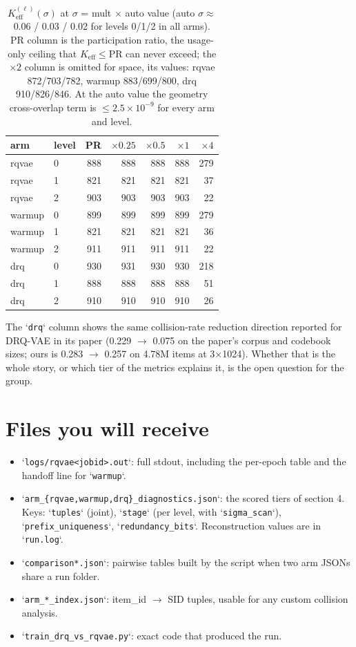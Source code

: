 \documentclass[11pt]{article}
\newcommand{\Keff}{K_{\mathrm{eff}}}
\begin{document}
\begin{table}[h]
\centering
\begin{tabular}{llrrrrr}
\toprule
arm & level & PR & $\times0.25$ & $\times0.5$ & $\times1$ & $\times4$ \\
\midrule
rqvae  & 0 & 888 & 888 & 888 & 888 & 279 \\
rqvae  & 1 & 821 & 821 & 821 & 821 & 37 \\
rqvae  & 2 & 903 & 903 & 903 & 903 & 22 \\
\midrule
warmup & 0 & 899 & 899 & 899 & 899 & 279 \\
warmup & 1 & 821 & 821 & 821 & 821 & 36 \\
warmup & 2 & 911 & 911 & 911 & 911 & 22 \\
\midrule
drq    & 0 & 930 & 931 & 930 & 930 & 218 \\
drq    & 1 & 888 & 888 & 888 & 888 & 51 \\
drq    & 2 & 910 & 910 & 910 & 910 & 26 \\
\bottomrule
\end{tabular}
\caption{$\Keff^{(\ell)}(\sigma)$ at $\sigma$ = mult $\times$ auto value
(auto $\sigma\approx$ 0.06 / 0.03 / 0.02 for levels 0/1/2 in all arms).
PR column is the participation ratio, the usage-only ceiling that
$\Keff\le$PR can never exceed; the $\times2$ column is omitted for space, its
values: rqvae 872/703/782, warmup 883/699/800,
drq 910/826/846. At the auto value the geometry cross-overlap term is
$\le 2.5\times10^{-9}$ for every arm and level.}
\end{table}

The `\texttt{drq}` column shows the same collision-rate reduction direction
reported for DRQ-VAE in its paper (0.229 $\to$ 0.075 on the paper's corpus and
codebook sizes; ours is 0.283 $\to$ 0.257 on 4.78M items at 3$\times$1024).
Whether that is the whole story, or which tier of the metrics explains it, is
the open question for the group.

\section{Files you will receive}

\begin{itemize}[nosep]
  \item `\texttt{logs/rqvae\textless jobid\textgreater.out}`: full stdout,
  including the per-epoch table and the handoff line for `\texttt{warmup}`.
  \item `\texttt{arm\_\{rqvae,warmup,drq\}\_diagnostics.json}`: the scored tiers
  of section 4. Keys: `\texttt{tuples}` (joint), `\texttt{stage}` (per level,
  with `\texttt{sigma\_scan}`), `\texttt{prefix\_uniqueness}`,
  `\texttt{redundancy\_bits}`. Reconstruction values are in `\texttt{run.log}`.
  \item `\texttt{comparison*.json}`: pairwise tables built by the script when
  two arm JSONs share a run folder.
  \item `\texttt{arm\_*\_index.json}`: item\_id $\to$ SID tuples, usable for
  any custom collision analysis.
  \item `\texttt{train\_drq\_vs\_rqvae.py}`: exact code that produced the run.
\end{itemize}
\end{document}
